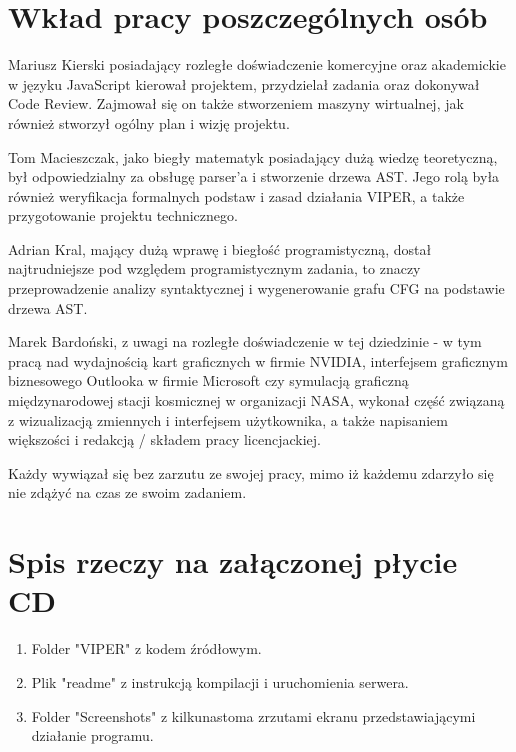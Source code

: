 \documentclass[a4paper,twoside,openright,11pt]{report}
\begin{document}
  \chapter {Wkład pracy poszczególnych osób}
\par Mariusz Kierski posiadający rozległe doświadczenie komercyjne oraz akademickie w języku JavaScript kierował projektem, przydzielał zadania oraz dokonywał Code Review. Zajmował się on także stworzeniem maszyny wirtualnej, jak również stworzył ogólny plan i wizję projektu.
\par Tom Macieszczak, jako biegły matematyk posiadający dużą wiedzę teoretyczną, był odpowiedzialny za obsługę parser'a i stworzenie drzewa AST. Jego rolą była również weryfikacja formalnych podstaw i zasad działania VIPER, a także przygotowanie projektu technicznego.
\par Adrian Kral, mający dużą wprawę i biegłość programistyczną, dostał najtrudniejsze pod względem programistycznym zadania, to znaczy przeprowadzenie analizy syntaktycznej i wygenerowanie grafu CFG na podstawie drzewa AST.  
\par Marek Bardoński, z uwagi na rozległe doświadczenie w tej dziedzinie - w tym pracą nad wydajnością kart graficznych w firmie NVIDIA, interfejsem graficznym biznesowego Outlooka w firmie Microsoft czy symulacją graficzną międzynarodowej stacji kosmicznej w organizacji NASA, wykonał część związaną z wizualizacją zmiennych i interfejsem użytkownika, a także napisaniem większości i redakcją / składem pracy licencjackiej.
\par Każdy wywiązał się bez zarzutu ze swojej pracy, mimo iż każdemu zdarzyło się nie zdążyć na czas ze swoim zadaniem.

  \chapter {Spis rzeczy na załączonej płycie CD}
  \begin {enumerate}
    \item Folder "VIPER" z kodem źródłowym.
    \item Plik "readme" z instrukcją kompilacji i uruchomienia serwera.
    \item Folder "Screenshots" z kilkunastoma zrzutami ekranu przedstawiającymi działanie programu.
  \end {enumerate}
  
\end{document}
